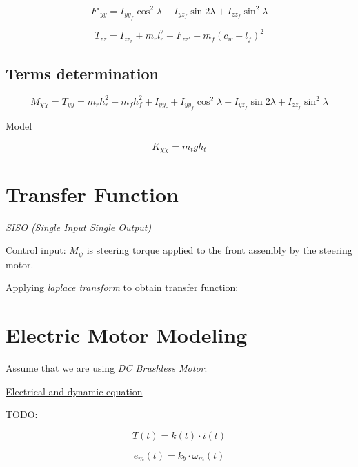 \documentclass[11pt]{article}
\begin{document}
\begin{equation}
    F'_{yy} = I_{yy_f}\cos^2\lambda + I_{yz_f}\sin2\lambda + I_{zz_f}\sin^2\lambda
\end{equation}

\begin{equation}
    T_{zz} = I_{zz_{r}} + m_r l^2_{r} + F_{zz'} + m_f(c_w + l_f)^2
\end{equation}

\subsection{Terms determination}
\begin{equation}
    M_{\chi\chi} = T_{yy} =  m_r h^2_r + m_fh^2_f + I_{yy_r} + I_{yy_f}\cos^2\lambda + I_{yz_f}\sin2\lambda + I_{zz_f}\sin^2\lambda
\end{equation}

Model

\begin{equation}
    K_{\chi\chi} = m_{t}gh_{t}
\end{equation}

\section{Transfer Function}

{\em SISO (Single Input Single Output)}

Control input:
$M_{\psi}$ is steering torque applied to the front assembly by the steering motor.

Applying {\em \href{http://tutorial.math.lamar.edu/pdf/Laplace_Table.pdf}{laplace transform}} to obtain transfer function:

\section{Electric Motor Modeling}

Assume that we are using {\em DC Brushless Motor}:

\href{http://ctms.engin.umich.edu/CTMS/index.php?example=MotorSpeed&section=SystemModeling#3}{Electrical and dynamic equation}

TODO:

\begin{equation}
    T(t) = k(t) \cdot i(t)
\end{equation}

\begin{equation}
    e_{m}(t) = k_{b} \cdot \omega_{m}(t)
\end{equation}
\end{document}

